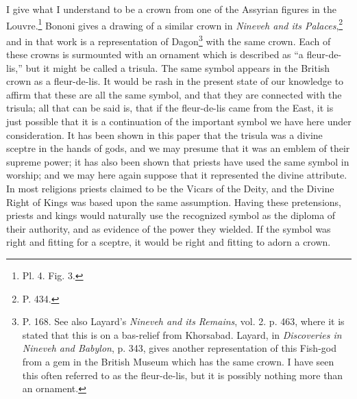 \documentclass[a4paper, 11pt, oneside, english]{article}
\begin{document}
I give what I understand to be a crown from one of the Assyrian figures in the Louvre.\footnote{Pl. 4. Fig. 3.} Bononi gives a drawing of a similar crown in \emph{Nineveh and its Palaces},\footnote{P. 434.} and in that work is a representation of Dagon\footnote{P. 168. See also Layard's \emph{Nineveh and its Remains}, vol. 2. p. 463, where it is stated that this is on a bas-relief from Khorsabad. Layard, in \emph{Discoveries in Nineveh and Babylon}, p. 343, gives another representation of this Fish-god from a gem in the British Museum which has the same crown. I have seen this often referred to as the fleur-de-lis, but it is possibly nothing more than an ornament.} with the same crown. Each of these crowns is surmounted with an ornament which is described as ``a fleur-de-lis,'' but it might be called a trisula. The same symbol appears in the British crown as a fleur-de-lis. It would be rash in the present state of our knowledge to affirm that these are all the same symbol, and that they are connected with the trisula; all that can be said is, that if the fleur-de-lis came from the East, it is just possible that it is a continuation of the important symbol we have here under consideration. It has been shown in this paper that the trisula was a divine sceptre in the hands of gods, and we may presume that it was an emblem of their supreme power; it has also been shown that priests have used the same symbol in worship; and we may here again suppose that it represented the divine attribute. In most religions priests claimed to be the Vicars of the Deity, and the Divine Right of Kings was based upon the same assumption. Having these pretensions, priests and kings would naturally use the recognized symbol as the diploma of their authority, and as evidence of the power they wielded. If the symbol was right and fitting for a sceptre, it would be right and fitting to adorn a crown.
\end{document}
